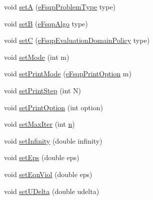 {\bf }\par
\begin{DoxyCompactItemize}
\item 
void \hyperlink{classocra_1_1FSQPSolver_a573fda5efbfac9ca2d99b10958160a86}{setA} (\hyperlink{classocra_1_1FSQPSolver_a1a9c37974603d734acab0d75bc9462ac}{e\+Fsqp\+Problem\+Type} type)
\item 
void \hyperlink{classocra_1_1FSQPSolver_ac3919237e155ce38812e392347abe654}{setB} (\hyperlink{classocra_1_1FSQPSolver_ad43d4e2dae6954df05123077cea0b7f5}{e\+Fsqp\+Algo} type)
\item 
void \hyperlink{classocra_1_1FSQPSolver_a452ec55df7f57747876dbfe99d8595e1}{setC} (\hyperlink{classocra_1_1FSQPSolver_a0569ab06022ffef1bd6d97599a5e4279}{e\+Fsqp\+Evaluation\+Domain\+Policy} type)
\item 
void \hyperlink{classocra_1_1FSQPSolver_a543877c4c3022dfa4af88a38a40a08bd}{set\+Mode} (int m)
\item 
void \hyperlink{classocra_1_1FSQPSolver_a02fd3ada48b6e18ab224fca60a05c525}{set\+Print\+Mode} (\hyperlink{classocra_1_1FSQPSolver_a4bb0d1e3b6b82bd9f683c6c7393f062d}{e\+Fsqp\+Print\+Option} m)
\item 
void \hyperlink{classocra_1_1FSQPSolver_a8ee31d7850b3984133df21c5a2687825}{set\+Print\+Step} (int N)
\item 
void \hyperlink{classocra_1_1FSQPSolver_a301b6055f9d7a24b94822858786bcbc5}{set\+Print\+Option} (int option)
\item 
void \hyperlink{classocra_1_1FSQPSolver_ab900ccf49e2e757fe67567a6da577675}{set\+Max\+Iter} (int \hyperlink{classocra_1_1Solver_a63e73904de66df69372ed91c6b9d058b}{n})
\item 
void \hyperlink{classocra_1_1FSQPSolver_a4fc0a343b2163f6100e2b3abee17ab46}{set\+Infinity} (double infinity)
\item 
void \hyperlink{classocra_1_1FSQPSolver_aba76d5017ed117ec8314f801eb3dd348}{set\+Eps} (double eps)
\item 
void \hyperlink{classocra_1_1FSQPSolver_a734027ea08acaa0d3b1b1b0b6ee9a12d}{set\+Eqn\+Viol} (double eps)
\item 
void \hyperlink{classocra_1_1FSQPSolver_aab6991e031ab120683b646968a5e8c91}{set\+U\+Delta} (double udelta)
\end{DoxyCompactItemize}

